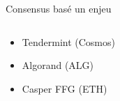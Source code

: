 \documentclass[presentation]{beamer}
\begin{document}
\begin{frame}[label={sec:org72fbc6c}]{Consensus basé un enjeu}
\begin{columns}
\begin{column}{0.6\columnwidth}
\begin{block}
{\begin{figure}[htbp]
\end{figure}
}
\begin{itemize}
\item <2-> Tendermint (Cosmos)
\item <3-> Algorand (ALG)
\item <4> Casper FFG (ETH)
\end{itemize}
\end{block}
\end{column}
\end{columns}
\end{frame}
\end{document}
